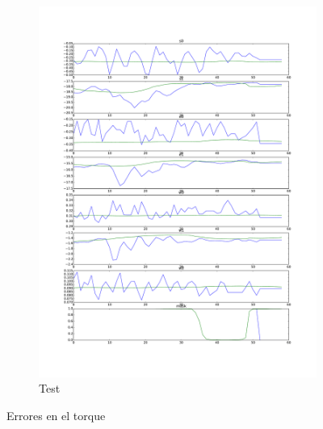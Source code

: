 \begin{figure}[hbt]
\begin{subfigure}{0.3\textwidth}
		\includegraphics[width=\linewidth]{imagenes/resultados/pred_test.pdf}
		\caption{Test}
		\label{fig:resultados/pred_test}
	\end{subfigure}
	\caption{Errores en el torque}
	\label{fig:resultados/pred}
\end{figure}

